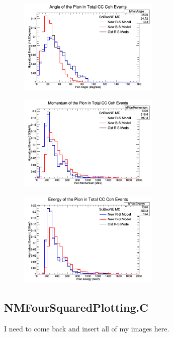 \documentclass[11pt]{article}
\begin{document}
\begin{figure}[H]
\centering
\includegraphics[width=0.6\textwidth]{NMPionPlottingImages/10-NMPionPlotting.png}
\caption{}
\end{figure}

\begin{figure}[H]
\centering
\includegraphics[width=0.6\textwidth]{NMPionPlottingImages/11-NMPionPlotting.png}
\caption{}
\end{figure}

\begin{figure}[H]
\centering
\includegraphics[width=0.6\textwidth]{NMPionPlottingImages/12-NMPionPlotting.png}
\caption{}
\end{figure}

\subsection{NMFourSquaredPlotting.C}
I need to come back and insert all of my images here.
\end{document}
